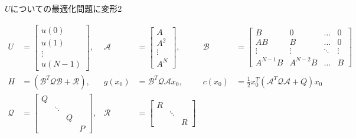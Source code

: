 \documentclass[dvipdfmx,12pt]{beamer}
\begin{document}
    \begin{frame}{$U$についての最適化問題に変形2}
        \tiny

        \begin{align*}
            U &= 
            \begin{bmatrix}
                u(0) \\
                u(1) \\
                \vdots \\
                u(N-1)
            \end{bmatrix}, &
            \mathcal{A} &= 
            \begin{bmatrix}
                A \\
                A^2 \\
                \vdots \\
                A^N
            \end{bmatrix}, &
            \mathcal{B} &=
            \begin{bmatrix}
                B & 0 & \ldots & 0 \\
                AB & B & \ldots & 0 \\
                \vdots & \vdots & \ddots & \vdots \\
                A^{N-1}B & A^{N-2}B & \ldots & B
            \end{bmatrix} \\
            H &= \left(\mathcal{B}^T \mathcal{Q B} + \mathcal{R}\right), &
            g(x_0) &= \mathcal{B}^T \mathcal{Q} \mathcal{A} x_0, &
            c(x_0) &= \frac{1}{2} x_0^T\left(\mathcal{A}^T \mathcal{Q} \mathcal{A} + Q\right) x_0 \\
            \mathcal{Q} &= \left[\begin{array}{cccc}
            Q & & & \\
            & \ddots & & \\
            & & Q & \\
            & & & P
            \end{array}\right], &
            \mathcal{R} &= \left[\begin{array}{ccc}
            R & & \\
            & \ddots & \\
            & & R
            \end{array}\right]
        \end{align*}
    \end{frame}
\end{document}
